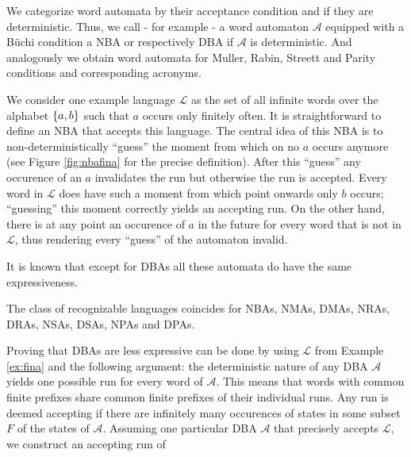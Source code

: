 We categorize word automata by their acceptance condition and if they are
deterministic. Thus, we call - for example - a word automaton $\mathcal{A}$
equipped with a Büchi condition a \ac{NBA} or respectively \ac{DBA} if
$\mathcal{A}$ is deterministic. And analogously we obtain word automata for
Muller, Rabin, Streett and Parity conditions and corresponding acronyms.
\begin{example}
  We consider one example language $\mathcal{L}$ as the set of all infinite
  words over the alphabet $\left\{a,b\right\}$ such that $a$ occurs only finitely often.
  It is straightforward to define an \ac{NBA} that accepts this language. The
  central idea of this \ac{NBA} is to non-deterministically \enquote{guess} the
  moment from which on no $a$ occurs anymore (see Figure \ref{fig:nbafina} for
  the precise definition). After this \enquote{guess} any occurence of an $a$
  invalidates the run but otherwise the run is accepted. Every word in
  $\mathcal{L}$ does have such a moment from which point onwards only $b$
  occurs; \enquote{guessing} this moment correctly yields an accepting run.
  On the other hand, there is at any point an occurence of $a$ in the future
  for every word that is not in $\mathcal{L}$, thus rendering every
  \enquote{guess} of the automaton invalid.
  \label{ex:fina}
\end{example}
It is known that except for \acp{DBA} all these automata do have the same
expressiveness.
\begin{theorem}
  \cite[Proposition 5.3, Theorem 5.4, Proposition 5.6]{LangAutoLog}
  The class of recognizable languages coincides for \acp{NBA}, \acp{NMA},
  \acp{DMA}, \acp{NRA}, \acp{DRA}, \acp{NSA}, \acp{DSA}, \acp{NPA} and
  \acp{DPA}.
\end{theorem}
Proving that \acp{DBA} are less expressive can be done by using
$\mathcal{L}$ from Example \ref{ex:fina} and the following argument: the
deterministic nature of any \ac{DBA} $\mathcal{A}$ yields one possible run for
every word of $\mathcal{A}$. This means that words with common finite prefixes
share common finite prefixes of their individual runs. Any run is deemed
accepting if there are infinitely many occurences of states in some subset $F$
of the states of $\mathcal{A}$. Assuming one particular \ac{DBA} $\mathcal{A}$
that precisely accepts $\mathcal{L}$, we construct an accepting run of

